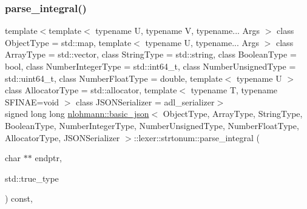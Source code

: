 \subsubsection{\texorpdfstring{parse\+\_\+integral()}{parse\_integral()}\hspace{0.1cm}{\footnotesize\ttfamily [1/2]}}
{\footnotesize\ttfamily template$<$template$<$ typename U, typename V, typename... Args $>$ class Object\+Type = std\+::map, template$<$ typename U, typename... Args $>$ class Array\+Type = std\+::vector, class String\+Type  = std\+::string, class Boolean\+Type  = bool, class Number\+Integer\+Type  = std\+::int64\+\_\+t, class Number\+Unsigned\+Type  = std\+::uint64\+\_\+t, class Number\+Float\+Type  = double, template$<$ typename U $>$ class Allocator\+Type = std\+::allocator, template$<$ typename T, typename S\+F\+I\+N\+A\+E=void $>$ class J\+S\+O\+N\+Serializer = adl\+\_\+serializer$>$ \\
signed long long \hyperlink{classnlohmann_1_1basic__json}{nlohmann\+::basic\+\_\+json}$<$ Object\+Type, Array\+Type, String\+Type, Boolean\+Type, Number\+Integer\+Type, Number\+Unsigned\+Type, Number\+Float\+Type, Allocator\+Type, J\+S\+O\+N\+Serializer $>$\+::lexer\+::strtonum\+::parse\+\_\+integral (\begin{DoxyParamCaption}\item[{char $\ast$$\ast$}]{endptr,  }\item[{std\+::true\+\_\+type}]{ }\end{DoxyParamCaption}) const\hspace{0.3cm}{\ttfamily [inline]}, {\ttfamily [private]}}

\mbox{\label{structnlohmann_1_1basic__json_1_1lexer_1_1strtonum_a8c3aa1c91358f647f90157de9e025f09}} 
